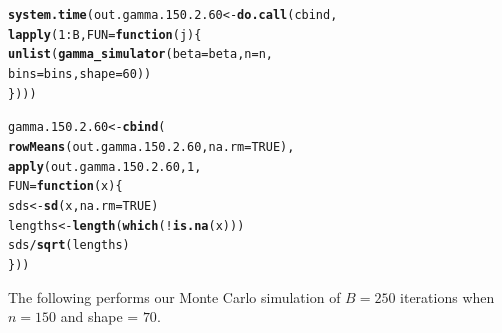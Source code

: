\documentclass[11pt]{article}\usepackage[]{graphicx}\usepackage[]{color}
\makeatletter
\newcommand{\hlnum}[1]{\textcolor[rgb]{0.686,0.059,0.569}{#1}}%
\newcommand{\hlopt}[1]{\textcolor[rgb]{0,0,0}{#1}}%
\newcommand{\hlstd}[1]{\textcolor[rgb]{0.345,0.345,0.345}{#1}}%
\newcommand{\hlkwa}[1]{\textcolor[rgb]{0.161,0.373,0.58}{\textbf{#1}}}%
\newcommand{\hlkwb}[1]{\textcolor[rgb]{0.69,0.353,0.396}{#1}}%
\newcommand{\hlkwc}[1]{\textcolor[rgb]{0.333,0.667,0.333}{#1}}%
\newcommand{\hlkwd}[1]{\textcolor[rgb]{0.737,0.353,0.396}{\textbf{#1}}}%
\newenvironment{kframe}{%
 \def\at@end@of@kframe{}%
 \ifinner\ifhmode%
  \def\at@end@of@kframe{\end{minipage}}%
  \begin{minipage}{\columnwidth}%
 \fi\fi%
 \def\FrameCommand##1{\hskip\@totalleftmargin \hskip-\fboxsep
 \colorbox{shadecolor}{##1}\hskip-\fboxsep
     \hskip-\linewidth \hskip-\@totalleftmargin \hskip\columnwidth}%
 \MakeFramed {\advance\hsize-\width
   \@totalleftmargin\z@ \linewidth\hsize
   \@setminipage}}%
 {\par\unskip\endMakeFramed%
 \at@end@of@kframe}
\newenvironment{knitrout}{}{} %
\makeatother
\begin{document}
\begin{knitrout}
\color{fgcolor}\begin{kframe}
\begin{alltt}
\hlkwd{system.time}\hlstd{(out.gamma.150.2.60} \hlkwb{<-} \hlkwd{do.call}\hlstd{(cbind,}
  \hlkwd{lapply}\hlstd{(}\hlnum{1}\hlopt{:}\hlstd{B,} \hlkwc{FUN} \hlstd{=} \hlkwa{function}\hlstd{(}\hlkwc{j}\hlstd{)\{}
    \hlkwd{unlist}\hlstd{(}\hlkwd{gamma_simulator}\hlstd{(}\hlkwc{beta} \hlstd{= beta,} \hlkwc{n} \hlstd{= n,}
      \hlkwc{bins} \hlstd{= bins,} \hlkwc{shape} \hlstd{=} \hlnum{60}\hlstd{))}
\hlstd{\})))}
\end{alltt}


{\ttfamily\noindent\bfseries\color{errorcolor}{\#\# Error in eval(family\$initialize): non-positive values not allowed for the 'gamma' family}}

{\ttfamily\noindent\itshape\color{messagecolor}{\#\# Timing stopped at: 0.003 0 0.002}}\end{kframe}
\end{knitrout}

\begin{knitrout}
\color{fgcolor}\begin{kframe}
\begin{alltt}
\hlstd{gamma.150.2.60} \hlkwb{<-} \hlkwd{cbind}\hlstd{(}
  \hlkwd{rowMeans}\hlstd{(out.gamma.150.2.60,} \hlkwc{na.rm} \hlstd{=} \hlnum{TRUE}\hlstd{),}
  \hlkwd{apply}\hlstd{(out.gamma.150.2.60,} \hlnum{1}\hlstd{,}
  \hlkwc{FUN} \hlstd{=} \hlkwa{function}\hlstd{(}\hlkwc{x}\hlstd{)\{}
    \hlstd{sds} \hlkwb{<-} \hlkwd{sd}\hlstd{(x,} \hlkwc{na.rm} \hlstd{=} \hlnum{TRUE}\hlstd{)}
    \hlstd{lengths} \hlkwb{<-} \hlkwd{length}\hlstd{(}\hlkwd{which}\hlstd{(}\hlopt{!}\hlkwd{is.na}\hlstd{(x)))}
    \hlstd{sds} \hlopt{/} \hlkwd{sqrt}\hlstd{(lengths)}
  \hlstd{\}))}
\end{alltt}


{\ttfamily\noindent\bfseries\color{errorcolor}{\#\# Error in is.data.frame(x): object 'out.gamma.150.2.60' not found}}\end{kframe}
\end{knitrout}

The following performs our Monte Carlo simulation of $B = 250$ iterations 
when $n = 150$ and shape = $70$.
\end{document}
